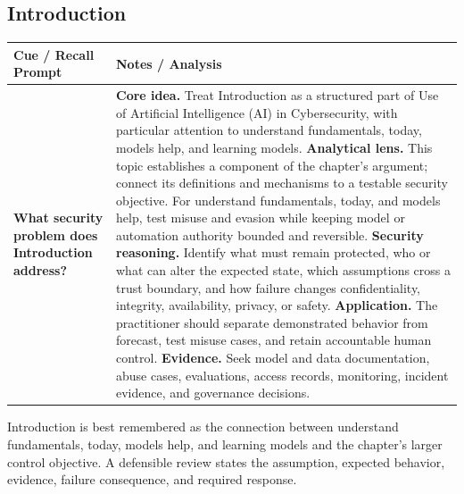 \documentclass[11pt]{article}
\newcommand{\CornellHeader}{%
\rowcolor{Navy}\color{white}\bfseries Cue / Recall Prompt & \color{white}\bfseries Notes / Analysis\\\hline}
\newcommand{\CornellRow}[2]{%
\cellcolor{CueGray}\RaggedRight\textbf{#1} & \RaggedRight #2\\\hline}
\begin{document}
\subsection*{Introduction}
\begin{longtable}{>{\RaggedRight\arraybackslash}p{}|>{\RaggedRight\arraybackslash}p{}}
\CornellHeader
\CornellRow{What security problem does Introduction address?}{\textbf{Core idea.} Treat Introduction as a structured part of Use of Artificial Intelligence (AI) in Cybersecurity, with particular attention to understand fundamentals, today, models help, and learning models. \textbf{Analytical lens.} This topic establishes a component of the chapter's argument; connect its definitions and mechanisms to a testable security objective. For understand fundamentals, today, and models help, test misuse and evasion while keeping model or automation authority bounded and reversible. \textbf{Security reasoning.} Identify what must remain protected, who or what can alter the expected state, which assumptions cross a trust boundary, and how failure changes confidentiality, integrity, availability, privacy, or safety. \textbf{Application.} The practitioner should separate demonstrated behavior from forecast, test misuse cases, and retain accountable human control. \textbf{Evidence.} Seek model and data documentation, abuse cases, evaluations, access records, monitoring, incident evidence, and governance decisions.}
\end{longtable}
\begin{topicsummary}
Introduction is best remembered as the connection between understand fundamentals, today, models help, and learning models and the chapter's larger control objective. A defensible review states the assumption, expected behavior, evidence, failure consequence, and required response.
\end{topicsummary}
\end{document}
